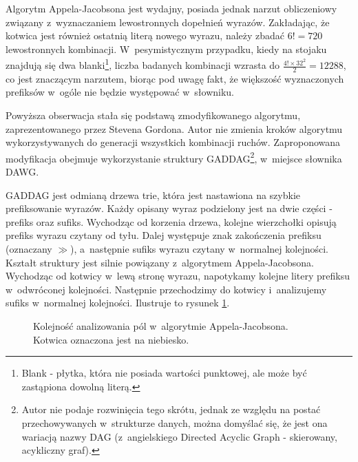 \documentclass[a4paper,twocolumn,12pt]{article}
\begin{document}
Algorytm Appela-Jacobsona jest wydajny, posiada jednak narzut obliczeniowy związany z~wyznaczaniem lewostronnych dopełnień wyrazów. Zakładając, że kotwica jest również ostatnią literą nowego wyrazu, należy zbadać $6! = 720$ lewostronnych kombinacji. W~pesymistycznym przypadku, kiedy na stojaku znajdują się dwa blanki\footnote{Blank - płytka, która nie posiada wartości punktowej, ale może być zastąpiona dowolną literą.}, liczba badanych kombinacji wzrasta do $\frac{4! \times 32^{2}}{2} = 12288$, co jest znaczącym narzutem, biorąc pod uwagę fakt, że większość wyznaczonych prefiksów w~ogóle nie będzie występować w~słowniku.

Powyższa obserwacja stała się podstawą zmodyfikowanego algorytmu, zaprezentowanego przez Stevena Gordona. \cite{faster_move_generation_algorithm} Autor nie zmienia kroków algorytmu wykorzystywanych do generacji wszystkich kombinacji ruchów. Zaproponowana modyfikacja obejmuje wykorzystanie struktury GADDAG\footnote{Autor nie podaje rozwinięcia tego skrótu, jednak ze względu na postać przechowywanych w~strukturze danych, można domyślać się, że jest ona wariacją nazwy DAG (z~angielskiego Directed Acyclic Graph - skierowany, acykliczny graf).}, w~miejsce słownika DAWG. 

GADDAG jest odmianą drzewa trie, która jest nastawiona na szybkie prefiksowanie wyrazów. Każdy opisany wyraz podzielony jest na dwie części - prefiks oraz sufiks. Wychodząc od korzenia drzewa, kolejne wierzchołki opisują prefiks wyrazu czytany od tyłu. Dalej występuje znak zakończenia prefiksu (oznaczany $\gg$), a~następnie sufiks wyrazu czytany w~normalnej kolejności. Kształt struktury jest silnie powiązany z~algorytmem Appela-Jacobsona. Wychodząc od kotwicy w~lewą stronę wyrazu, napotykamy kolejne litery prefiksu w~odwróconej kolejności. Następnie przechodzimy do kotwicy i~analizujemy sufiks w~normalnej kolejności. Ilustruje to rysunek \ref{fig:gaddag_basis}. 

\begin{figure}[ht!]
	\begin{center}
	\end{center}
	\caption{Kolejność analizowania pól w~algorytmie Appela-Jacobsona. Kotwica oznaczona jest na niebiesko.}
	\label{fig:gaddag_basis}
\end{figure}
\end{document}
